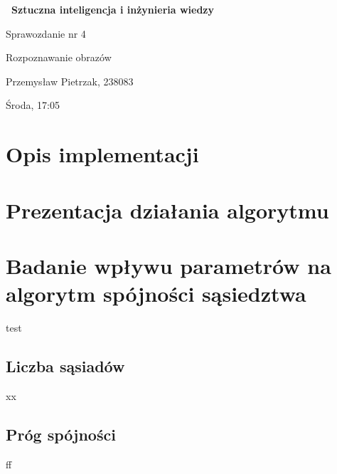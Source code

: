 \documentclass[a4paper,10pt]{article}
\begin{document}
    \begin{titlepage}
     \vspace*{\fill}
    
     \vspace*{-4cm}
     \Huge\bfseries\
     {Sztuczna inteligencja i inżynieria wiedzy}
    
     \LARGE
     \centering
     \vspace{2cm}
     {Sprawozdanie nr 4}
    
     \Large
     \centering
     {Rozpoznawanie obrazów}
     
     \vspace*{0.5cm}
     
     \centering
     \large 
     \vspace{0.5cm}
     Przemysław Pietrzak, 238083
     
     Środa, 17:05
     
     \vspace*{\fill}
     \restoregeometry
    \end{titlepage}
    
    \newpage
    \tableofcontents
    
    \newpage
    \justify
    \section{Opis implementacji}
    
    
    \justify
    \section{Prezentacja działania algorytmu}
    
    
    \newpage
    \justify
    \section{Badanie wpływu parametrów na algorytm spójności sąsiedztwa}
    test
    
    \subsection{Liczba sąsiadów}
    xx
    
    \subsection{Próg spójności}
    ff
    
\end{document}
